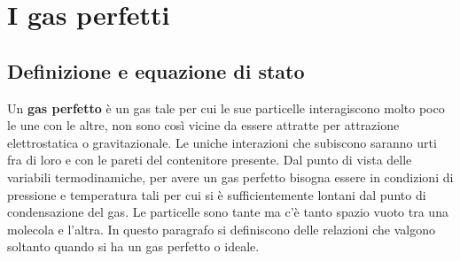 \documentclass[10pt,a4paper]{book}
\begin{document}
\section{I gas perfetti}

\subsection{Definizione e equazione di stato}

Un \textbf{gas perfetto} è un gas tale per cui le sue particelle interagiscono molto poco le une con le altre, non sono così vicine da essere attratte per attrazione elettrostatica o gravitazionale. Le uniche interazioni che subiscono saranno urti fra di loro e con le pareti del contenitore presente. Dal punto di vista delle variabili termodinamiche, per avere un gas perfetto bisogna essere in condizioni di pressione e temperatura tali per cui si è sufficientemente lontani dal punto di condensazione del gas. Le particelle sono tante ma c'è tanto spazio vuoto tra una molecola e l'altra. In questo paragrafo si definiscono delle relazioni che valgono soltanto quando si ha un gas perfetto o ideale.
\end{document}
